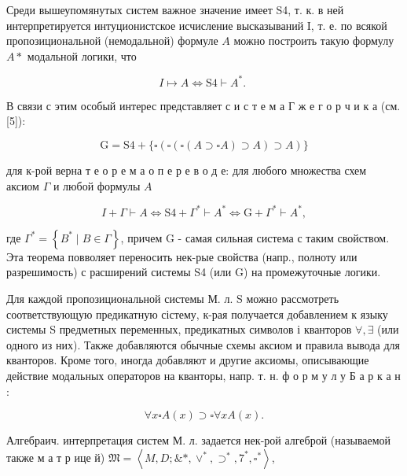 \documentclass[10pt]{article}
\begin{document}
Среди вышеупомянутых систем важное значение имеет S4, т. к. в ней интерпретируется интуционистское исчисление высказываний I, т. е. по всякой пропозициональной (немодальной) формуле $A$ можно построить такую формулу $A *$ модальной логики, что



\[

I \longmapsto A \Longleftrightarrow \mathrm{S} 4 \vdash A^{*} \text {. }

\]



В связи с этим особый интерес представляет с и с т е м а Г ж е г о р ч и к а (см. [5]):



\[

\mathrm{G}=\mathrm{S} 4+\{\square(\square(\square(A \supset \square A) \supset A) \supset A)\}

\]



для к-рой верна т е о р е м а о п е р е в о д е: для любого множества схем аксиом $\Gamma$ и любой формулы $A$



\[

I+\Gamma \vdash A \Longleftrightarrow \mathrm{S} 4+\Gamma^{*} \vdash A^{*} \Longleftrightarrow \mathrm{G}+\Gamma^{*} \vdash A^{*},

\]



где $\Gamma^{*}=\left\{B^{*} \mid B \in \Gamma\right\}$, причем $\mathrm{G}$ - самая сильная система с таким свойством. Эта теорема повволяет переносить нек-рые свойства (напр., полноту или разрешимость) с расширений системы S4 (или G) на промежуточные логики.



Для каждой пропозициональной системы М. л. S можно рассмотреть соответствующую предикатную сістему, к-рая получается добавлением к языку системы S предметных переменных, предикатных символов і кванторов $\forall, \exists$ (или одного из них). Также добавляются обычные схемы аксиом и правила вывода для кванторов. Кроме того, иногда добавляют и другие аксиомы, описывающие действие модальных операторов на кванторы, напр. т. н. ф о р м у л у Б а р к а н :



\[

\forall x \square A(x) \supset \square \forall x A(x) .

\]



Алгебраич. интерпретация систем М. л. задается нек-рой алгеброй (называемой также м а т р ице й) $\mathfrak{M}=\left\langle M, D ; \& *, \vee^{*}, \supset^{*}, 7^{*}, \square^{*}\right\rangle$,
\end{document}
